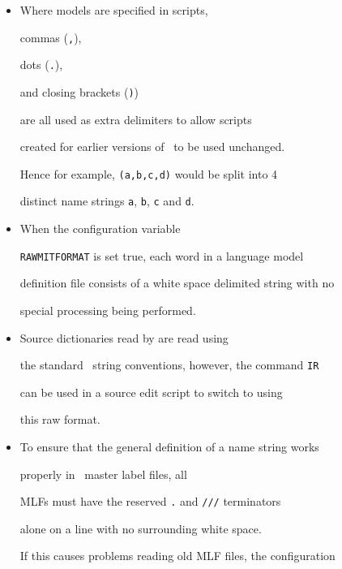 \begin{itemize}





\item  Where models are specified in  scripts,


commas (\verb+,+), 


dots (\verb+.+),


and closing brackets (\verb+)+) 


are all used as extra delimiters to allow   scripts


created for earlier versions of \HTK\ to be used unchanged.


Hence for example, \texttt{(a,b,c,d)} would be split into 4 


distinct name strings \texttt{a}, \texttt{b}, \texttt{c} and \texttt{d}.





\item When the configuration variable


\texttt{RAWMITFORMAT} is set true,  each word in a language model


definition file consists of a white space delimited string with no 


special processing being performed.





\item  Source dictionaries read by  are read using


the standard \HTK\ string conventions, however, the command \texttt{IR}


can be used in a  source edit script to switch to using


this raw format.





\item 


To ensure that the general definition of a name string works


properly in \HTK\ master label files, all


MLFs must have the reserved \texttt{.} and \verb+///+ terminators 


alone on a line with no surrounding white space. 


If this causes problems reading old MLF files, the configuration



\end{itemize}
